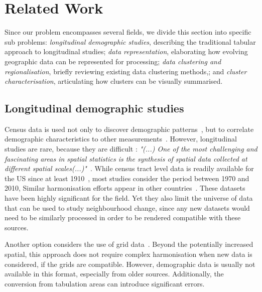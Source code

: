 \section{Related Work}
\label{sec:related}

Since our problem encompasses several fields, we divide this section into
specific sub problems: \emph{longitudinal demographic studies}, describing the
traditional tabular approach to longitudinal studies; \emph{data
representation}, elaborating how evolving geographic data can be represented for
processing; \emph{data clustering and regionalisation}, briefly reviewing
existing data clustering methods,; and \emph{cluster characterisation}, articulating how clusters
can be visually summarised.

\subsection{Longitudinal demographic studies}
Census data is used not only to discover demographic
patterns~\citep{Firebaugh2016}, but to correlate demographic characteristics to
other measurements~\citep{diez1997neighborhood}. However, longitudinal studies
are rare, because they are difficult : \emph{"(...) One of the most challenging
and fascinating areas in spatial statistics is the synthesis of spatial data
collected at different spatial scales(...)"}~\citep{gotway2002combining}. While
census tract level data is readily available for the US since at least
1910~\citep{nhgis}, most studies consider the period between 1970 and 2010,
 Similar harmonisation
efforts appear in other countries~\citep{Liu2015,Lee2015,Allen2018}. These
datasets have been highly significant for the field. Yet they also limit the
universe of data that can be used to study neighbourhood change, since any new
datasets would need to be similarly processed in order to be rendered compatible
with these sources. 

Another option considers the use of grid
data~\citep{Dmowska2017,Dmowska2018,stepinski2019imperfect}. Beyond the
potentially increased spatial, this approach does not
require complex harmonisation when new data is considered, if the grids are
compatible. However, demographic data is usually not available in this format,
especially from older sources. Additionally, the conversion from tabulation
areas can introduce significant errors.

